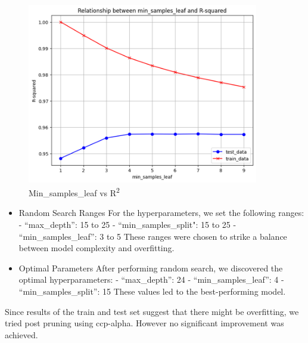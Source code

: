 \documentclass[12pt]{report}
\begin{document}
\begin{figure}[h]
    \vspace{0.5cm} %
    \begin{minipage}{0.6\textwidth}
        \centering
        \includegraphics[width=0.9\textwidth]{unnamed-3.png}
        \caption{Min\_samples\_leaf vs R\textsuperscript{2}}
        \label{pic3} %
    \end{minipage}
    
 
\end{figure}






\begin{itemize}

    \item Random Search Ranges
For the hyperparameters, we set the following ranges:
- “max\_depth”: 15 to 25
- “min\_samples\_split": 15 to 25
- “min\_samples\_leaf”: 3 to 5
These ranges were chosen to strike a balance between model complexity and overfitting.

    \item Optimal Parameters
After performing random search, we discovered the optimal hyperparameters:
- “max\_depth”: 24
- “min\_samples\_leaf”: 4
- “min\_samples\_split”: 15
These values led to the best-performing model.

\end{itemize}

Since results of the train and test set suggest that there might be overfitting, we tried post pruning using ccp-alpha.
However no significant improvement was achieved.
\end{document}
